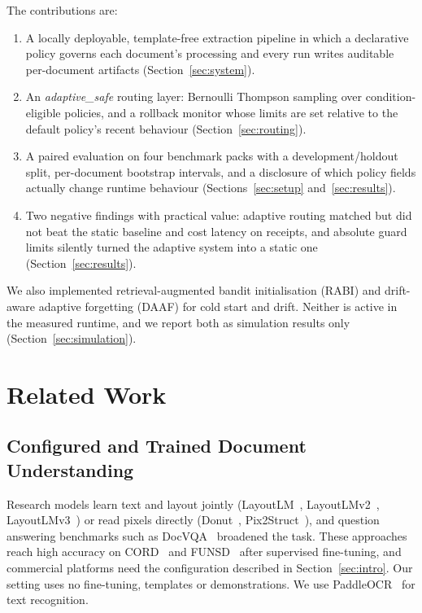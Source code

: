 \documentclass[conference,a4paper]{IEEEtran}
\begin{document}
The contributions are:
\begin{enumerate}
\item A locally deployable, template-free extraction pipeline in which a declarative policy governs each document's processing and every run writes auditable per-document artifacts (Section~\ref{sec:system}).
\item An \emph{adaptive\_safe} routing layer: Bernoulli Thompson sampling over condition-eligible policies, and a rollback monitor whose limits are set relative to the default policy's recent behaviour (Section~\ref{sec:routing}).
\item A paired evaluation on four benchmark packs with a development/holdout split, per-document bootstrap intervals, and a disclosure of which policy fields actually change runtime behaviour (Sections~\ref{sec:setup} and~\ref{sec:results}).
\item Two negative findings with practical value: adaptive routing matched but did not beat the static baseline and cost latency on receipts, and absolute guard limits silently turned the adaptive system into a static one (Section~\ref{sec:results}).
\end{enumerate}
We also implemented retrieval-augmented bandit initialisation (RABI) and drift-aware adaptive forgetting (DAAF) for cold start and drift. Neither is active in the measured runtime, and we report both as simulation results only (Section~\ref{sec:simulation}).

\section{Related Work}

\subsection{Configured and Trained Document Understanding}
Research models learn text and layout jointly (LayoutLM~\cite{layoutlm}, LayoutLMv2~\cite{layoutlmv2}, LayoutLMv3~\cite{layoutlmv3}) or read pixels directly (Donut~\cite{donut}, Pix2Struct~\cite{pix2struct}), and question answering benchmarks such as DocVQA~\cite{docvqa} broadened the task. These approaches reach high accuracy on CORD~\cite{cord} and FUNSD~\cite{funsd} after supervised fine-tuning, and commercial platforms need the configuration described in Section~\ref{sec:intro}. Our setting uses no fine-tuning, templates or demonstrations. We use PaddleOCR~\cite{ppocr} for text recognition.
\end{document}
